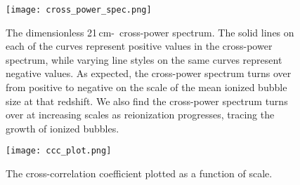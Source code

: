 \begin{figure}[ht]
	\centering
	\texttt{[image: cross\_power\_spec.png]}
	\caption[21\,cm-\lya\ Cross-Power Spectrum]{The dimensionless 21\,cm-\lya\ cross-power spectrum. The
           solid lines on each of the curves represent positive values in the cross-power spectrum, while varying line
           styles on the same curves represent negative values. As expected, the cross-power spectrum turns over from
           positive to negative on the scale of the mean ionized bubble size at that redshift. We also find the cross-power
           spectrum turns over at increasing scales as reionization progresses, tracing the growth of ionized bubbles.}
	\label{fig:x_ps}
\end{figure}

\begin{figure}[ht]
	\centering
	\texttt{[image: ccc\_plot.png]}
	\caption[Cross-Correlation Coefficient]{The cross-correlation coefficient plotted as a function of scale. }
	\label{fig:ccc}
\end{figure}
